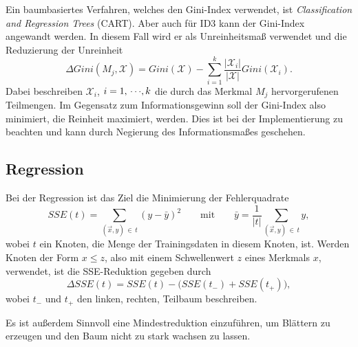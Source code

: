 			Ein baumbasiertes Verfahren, welches den Gini-Index verwendet, ist \emph{Classification and Regression Trees} (CART). Aber auch für ID3 kann der Gini-Index angewandt werden. In diesem Fall wird er als Unreinheitsmaß verwendet und die Reduzierung der Unreinheit
			\begin{equation}
				\Delta \textit{Gini}(M_j, \mathcal{X}) = \textit{Gini}(\mathcal{X}) - \sum_{i = 1}^{k} \frac{\lvert \mathcal{X}_i \rvert}{\lvert \mathcal{X} \rvert} \textit{Gini}(\mathcal{X}_i).
			\end{equation}
			Dabei beschreiben \( \mathcal{X}_i \), \( i = 1,\,\cdots\!,k \) die durch das Merkmal \(M_j\) hervorgerufenen Teilmengen. Im Gegensatz zum Informationsgewinn soll der Gini-Index also minimiert, \dh die Reinheit maximiert, werden. Dies ist bei der Implementierung zu beachten und kann \bspw durch Negierung des Informationsmaßes geschehen.

		\subsection{Regression}
			Bei der Regression ist das Ziel die Minimierung der Fehlerquadrate
			\begin{equation}
				\textit{SSE}(t) = \sum_{(\vec{x}, y) \,\in\, t} (y - \bar{y})^2
				\qquad\text{mit}\qquad
				\bar{y} = \frac{1}{\lvert t \rvert} \sum_{(\vec{x}, y) \,\in\, t} y,
			\end{equation}
			wobei \(t\) ein Knoten, \bzw die Menge der Trainingsdaten in diesem Knoten, ist. Werden Knoten der Form \( x \leq z \), also mit einem Schwellenwert \(z\) \bzgl eines Merkmals \(x\), verwendet, ist die SSE-Reduktion gegeben durch
			\begin{equation}
				\Delta \textit{SSE}(t) = \textit{SSE}(t) - \big( \textit{SSE}(t_-) + \textit{SSE}(t_+) \big),
			\end{equation}
			wobei \(t_-\) und \(t_+\) den linken, \bzw rechten, Teilbaum beschreiben.

			Es ist außerdem Sinnvoll eine Mindestreduktion einzuführen, um Blättern zu erzeugen und den Baum nicht zu stark wachsen zu lassen.

